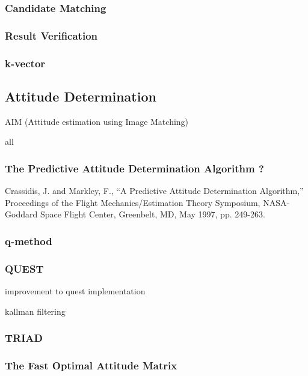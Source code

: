 \documentclass[12pt,a4paper,oneside]{article}
\begin{document}
\subsubsection{Candidate Matching}
\subsubsection{Result Verification}
\subsubsection{k-vector}

\cite{mortari2013k}\par
\cite{mortari1996fast}\par
\cite{mortari2000k}\par

\subsection{Attitude Determination}
\cite{jenssen2011comparison}\par
AIM (Attitude estimation using Image Matching)\cite{2012highly}\par
all \cite{hall2003spacecraft} \cite{markley1999estimate}
\subsubsection{The Predictive Attitude Determination Algorithm ?}
Crassidis, J. and Markley, F., “A Predictive Attitude Determination Algorithm,”
Proceedings of the Flight Mechanics/Estimation Theory Symposium, NASA-Goddard
Space Flight Center, Greenbelt, MD, May 1997, pp. 249-263.
\subsubsection{q-method}
\subsubsection{QUEST}
improvement to quest implementation \cite{RIS_1} \par
kallman filtering \cite{shuster1990kalman}
\subsubsection{TRIAD}
\subsubsection{The Fast Optimal Attitude Matrix}
\end{document}
